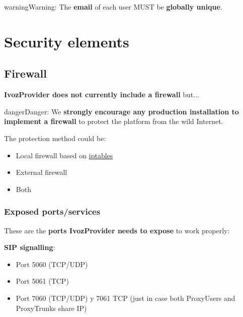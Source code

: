 \documentclass[letterpaper,10pt,english]{sphinxmanual}
\begin{document}
\begin{notice}{warning}{Warning:}
The \textbf{email} of each user MUST be \textbf{globally unique}.
\end{notice}


\chapter{Security elements}
\label{security/index:security-elements}\label{security/index::doc}

\section{Firewall}
\label{security/index:firewall}
\textbf{IvozProvider does not currently include a firewall} but...

\begin{notice}{danger}{Danger:}
We \textbf{strongly encourage any production installation to implement
a firewall} to protect the platform from the wild Internet.
\end{notice}

The protection method could be:
\begin{itemize}
\item {} 
Local firewall based on \href{https://www.netfilter.org/}{iptables}

\item {} 
External firewall

\item {} 
Both

\end{itemize}


\subsection{Exposed ports/services}
\label{security/index:exposed-ports-services}
These are the \textbf{ports IvozProvider needs to expose} to work properly:

\textbf{SIP signalling}:
\begin{itemize}
\item {} 
Port 5060 (TCP/UDP)

\item {} 
Port 5061 (TCP)

\item {} 
Port 7060 (TCP/UDP) y 7061 TCP (just in case both ProxyUsers and ProxyTrunks share IP)

\end{itemize}
\end{document}
